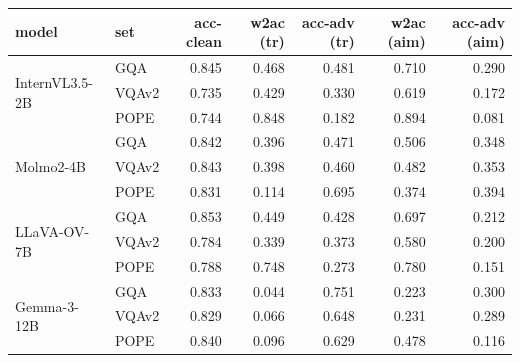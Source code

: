 \footnotesize
\setlength{\tabcolsep}{5pt}
\begin{tabular}{@{}llrrrrr@{}}
\toprule
model & set & acc-clean & w2ac (tr) & acc-adv (tr) & w2ac (aim) & acc-adv (aim) \\
\midrule
\multirow{3}{*}{InternVL3.5-2B} & GQA & 0.845 & 0.468 & 0.481 & 0.710 & 0.290 \\
 & VQAv2 & 0.735 & 0.429 & 0.330 & 0.619 & 0.172 \\
 & POPE & 0.744 & 0.848 & 0.182 & 0.894 & 0.081 \\
\midrule
\multirow{3}{*}{Molmo2-4B} & GQA & 0.842 & 0.396 & 0.471 & 0.506 & 0.348 \\
 & VQAv2 & 0.843 & 0.398 & 0.460 & 0.482 & 0.353 \\
 & POPE & 0.831 & 0.114 & 0.695 & 0.374 & 0.394 \\
\midrule
\multirow{3}{*}{LLaVA-OV-7B} & GQA & 0.853 & 0.449 & 0.428 & 0.697 & 0.212 \\
 & VQAv2 & 0.784 & 0.339 & 0.373 & 0.580 & 0.200 \\
 & POPE & 0.788 & 0.748 & 0.273 & 0.780 & 0.151 \\
\midrule
\multirow{3}{*}{Gemma-3-12B} & GQA & 0.833 & 0.044 & 0.751 & 0.223 & 0.300 \\
 & VQAv2 & 0.829 & 0.066 & 0.648 & 0.231 & 0.289 \\
 & POPE & 0.840 & 0.096 & 0.629 & 0.478 & 0.116 \\
\bottomrule
\end{tabular}

